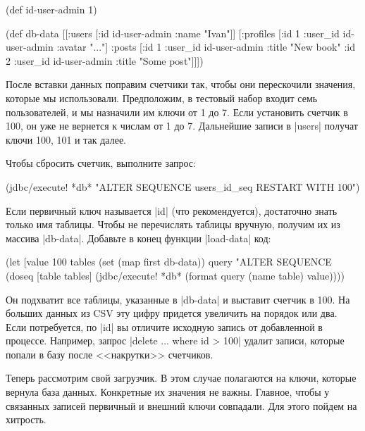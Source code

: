 \begin{english}
  \begin{clojure}
(def id-user-admin 1)

(def db-data
  [[:users [{:id id-user-admin :name "Ivan"}]]
   [:profiles [{:id 1 :user_id id-user-admin :avatar "..."}]
    :posts [{:id 1 :user_id id-user-admin :title "New book"}
            {:id 2 :user_id id-user-admin :title "Some post"}]]])
  \end{clojure}
\end{english}

После вставки данных поправим счетчики так, чтобы они перескочили значения,
которые мы использовали. Предположим, в тестовый набор входит семь
пользователей, и мы назначили им ключи от 1 до 7. Если установить счетчик в 100,
он уже не вернется к числам от 1 до 7. Дальнейшие записи в \spverb|users|
получат ключи 100, 101 и так далее.

Чтобы сбросить счетчик, выполните запрос:

\begin{english}
  \begin{clojure}
(jdbc/execute! *db* "ALTER SEQUENCE users_id_seq RESTART WITH 100")
  \end{clojure}
\end{english}

Если первичный ключ называется \spverb|id| (что рекомендуется), достаточно знать
только имя таблицы. Чтобы не перечислять таблицы вручную, получим их из массива
\spverb|db-data|. Добавьте в конец функции \spverb|load-data| код:

\begin{english}
  \begin{clojure}
(let [value 100
      tables (set (map first db-data))
      query "ALTER SEQUENCE %
  (doseq [table tables]
    (jdbc/execute! *db* (format query (name table) value))))
  \end{clojure}
\end{english}

Он подхватит все таблицы, указанные в \spverb|db-data| и выставит счетчик в 100.
На больших данных из CSV эту цифру придется увеличить на порядок или два. Если
потребуется, по \spverb|id| вы отличите исходную запись от добавленной в
процессе. Например, запрос \spverb|delete ... where id > 100| удалит
записи, которые попали в базу после <<накрутки>> счетчиков.

Теперь рассмотрим свой загрузчик. В этом случае полагаются на ключи, которые
вернула база данных. Конкретные их значения не важны. Главное, чтобы у связанных
записей первичный и внешний ключи совпадали. Для этого пойдем на хитрость.


